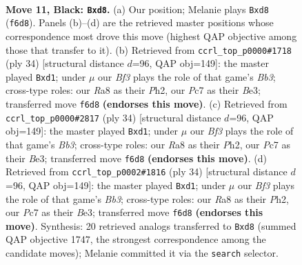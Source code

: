 \documentclass[11pt]{article}
\begin{document}
\clearpage

\begin{figure}[p]\centering
\begin{subfigure}{0.46\textwidth}\centering
\resizebox{\linewidth}{!}{%
\newchessgame
\chessboard[
  setfen={rn1Q1rk1/ppp2pp1/5b1p/4P3/2p3bP/2N1PN2/PP3P2/R3KB1R b KQ - 0 11},
  showmover=false,
  pgfstyle=straightmove, color=movearrow, markmove={f6-d8}
]}
\caption{}
\end{subfigure}\hfill
\begin{subfigure}{0.46\textwidth}\centering
\resizebox{\linewidth}{!}{%
\newchessgame
\chessboard[
  setfen={rn3rk1/1b3ppp/p3p3/2n2N2/Pp6/1B2B3/1P3PPP/R2q1RK1 w - - 0 18},
  showmover=false,
  pgfstyle=straightmove, color=movearrow, markmove={b3-d1}
]}
\caption{}
\end{subfigure}
\\[4pt]
\begin{subfigure}{0.46\textwidth}\centering
\resizebox{\linewidth}{!}{%
\newchessgame
\chessboard[
  setfen={rn3rk1/1b3ppp/p3p3/2n2N2/Pp6/1B2B3/1P3PPP/R2q1RK1 w - - 0 18},
  showmover=false,
  pgfstyle=straightmove, color=movearrow, markmove={b3-d1}
]}
\caption{}
\end{subfigure}\hfill
\begin{subfigure}{0.46\textwidth}\centering
\resizebox{\linewidth}{!}{%
\newchessgame
\chessboard[
  setfen={rn3rk1/1b3ppp/p3p3/2n2N2/Pp6/1B2B3/1P3PPP/R2q1RK1 w - - 0 18},
  showmover=false,
  pgfstyle=straightmove, color=movearrow, markmove={b3-d1}
]}
\caption{}
\end{subfigure}
\caption{\textbf{Move 11, Black: \texttt{Bxd8}.} (a) Our position; Melanie plays \texttt{Bxd8} (\texttt{f6d8}). Panels (b)--(d) are the retrieved master positions whose correspondence most drove this move (highest QAP objective among those that transfer to it). (b) Retrieved from \texttt{ccrl\_top\_p0000\#1718} (ply 34) [structural distance $d$=96, QAP obj=149]: the master played \texttt{Bxd1}; under $\mu$ our \emph{Bf3} plays the role of that game's \emph{Bb3}; cross-type roles: our \emph{R}a8 as their \emph{P}h2, our \emph{P}c7 as their \emph{B}e3; transferred move \texttt{f6d8} \textbf{(endorses this move)}. (c) Retrieved from \texttt{ccrl\_top\_p0000\#2817} (ply 34) [structural distance $d$=96, QAP obj=149]: the master played \texttt{Bxd1}; under $\mu$ our \emph{Bf3} plays the role of that game's \emph{Bb3}; cross-type roles: our \emph{R}a8 as their \emph{P}h2, our \emph{P}c7 as their \emph{B}e3; transferred move \texttt{f6d8} \textbf{(endorses this move)}. (d) Retrieved from \texttt{ccrl\_top\_p0002\#1816} (ply 34) [structural distance $d$=96, QAP obj=149]: the master played \texttt{Bxd1}; under $\mu$ our \emph{Bf3} plays the role of that game's \emph{Bb3}; cross-type roles: our \emph{R}a8 as their \emph{P}h2, our \emph{P}c7 as their \emph{B}e3; transferred move \texttt{f6d8} \textbf{(endorses this move)}. Synthesis: 20 retrieved analogs transferred to \texttt{Bxd8} (summed QAP objective 1747, the strongest correspondence among the candidate moves); Melanie committed it via the \texttt{search} selector.}
\label{fig:thought-m21}
\end{figure}
\end{document}
